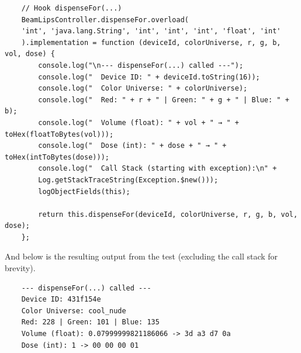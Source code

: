 \begin{verbatim}
	// Hook dispenseFor(...)
	BeamLipsController.dispenseFor.overload(
	'int', 'java.lang.String', 'int', 'int', 'int', 'float', 'int'
	).implementation = function (deviceId, colorUniverse, r, g, b, vol, dose) {
		console.log("\n--- dispenseFor(...) called ---");
		console.log("  Device ID: " + deviceId.toString(16));
		console.log("  Color Universe: " + colorUniverse);
		console.log("  Red: " + r + " | Green: " + g + " | Blue: " + b);
		console.log("  Volume (float): " + vol + " → " + toHex(floatToBytes(vol)));
		console.log("  Dose (int): " + dose + " → " + toHex(intToBytes(dose)));
		console.log("  Call Stack (starting with exception):\n" +
		Log.getStackTraceString(Exception.$new()));
		logObjectFields(this);
		
		return this.dispenseFor(deviceId, colorUniverse, r, g, b, vol, dose);
	};
\end{verbatim}

And below is the resulting output from the test (excluding the call stack for brevity). 

\begin{verbatim}
	--- dispenseFor(...) called ---
	Device ID: 431f154e
	Color Universe: cool_nude
	Red: 228 | Green: 101 | Blue: 135
	Volume (float): 0.07999999821186066 -> 3d a3 d7 0a
	Dose (int): 1 -> 00 00 00 01
\end{verbatim}


